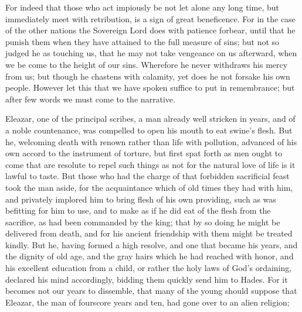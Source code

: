 {For indeed that those who act impiously be not let alone any long time, but immediately meet with retribution, is a sign of great beneficence.
For in the case of the other nations the Sovereign Lord does with patience forbear, until that he punish them when they have attained to the full measure of
{} sins; but not so judged he as touching us,
that he may not take vengeance on us afterward,
 when we be come to the
 height of our sins.
Wherefore he never withdraws his mercy from us; but though he chastens with calamity, yet does he not forsake his own people.
However let this that we have spoken suffice to put
{} in remembrance; but after
{} few words we must come to the narrative.
\par }{\PP {}Eleazar, one of the principal scribes, a man already well stricken in years, and of a noble countenance, was compelled to open his mouth to eat swine’s flesh.
But he, welcoming death with renown rather than life with pollution, advanced of his own accord to the instrument of torture, but first spat forth
{}
 as men ought to come that are resolute to repel such things as not
{} for the natural love of life is it lawful to taste.
But those who had the charge of that forbidden sacrificial feast took the man aside, for the acquaintance which of old times they had with him, and privately implored him to bring flesh of his own providing, such as was befitting for him to use, and to make as if he did eat of the flesh from the sacrifice, as had been commanded by the king;
that by so doing he might be delivered from death, and for his ancient friendship with them might be treated kindly.
But he, having formed a high resolve, and one that became his years, and the dignity of old age, and the gray hairs
 which he had reached with honor, and his excellent
 education from a child,
 or rather
{} the holy
 laws of God’s ordaining, declared his mind accordingly, bidding them quickly send him to Hades.
For it becomes not our years to dissemble,
{} that
{} many of the young should suppose that Eleazar, the man of fourscore years and ten, had gone over to an alien religion;
}
